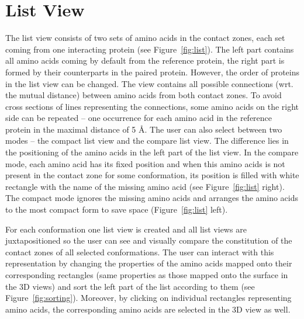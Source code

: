 \documentclass[journal]{vgtc}                %
\begin{document}
\section{List View}
The list view consists of two sets of amino acids in the contact zones, each set coming from one interacting protein (see Figure~\ref{fig:list}).
The left part contains all amino acids coming by default from the reference protein, the right part is formed by their counterparts in the paired protein.
However, the order of proteins in the list view can be changed.
The view contains all possible connections (wrt. the mutual distance) between amino acids from both contact zones.
To avoid cross sections of lines representing the connections, some amino acids on the right side can be repeated -- one occurrence for each amino acid in the reference protein in the maximal distance of 5 \AA. 
The user can also select between two modes -- the compact list view and the compare list view.
The difference lies in the positioning of the amino acids in the left part of the list view. 
In the compare mode, each amino acid has its fixed position and when this amino acids is not present in the contact zone for some conformation, its position is filled with white rectangle with the name of the missing amino acid (see Figure~\ref{fig:list} right).
The compact mode ignores the missing amino acids and arranges the amino acids to the most compact form to save space (Figure~\ref{fig:list} left).
 
For each conformation one list view is created and all list views are juxtapositioned so the user can see and visually compare the constitution of the contact zones of all selected conformations.
The user can interact with this representation by changing the properties of the amino acids mapped onto their corresponding rectangles (same properties as those mapped onto the surface in the 3D views) and sort the left part of the list according to them (see Figure~\ref{fig:sorting}).
Moreover, by clicking on individual rectangles representing amino acids, the corresponding amino acids are selected in the 3D view as well.
\end{document}
